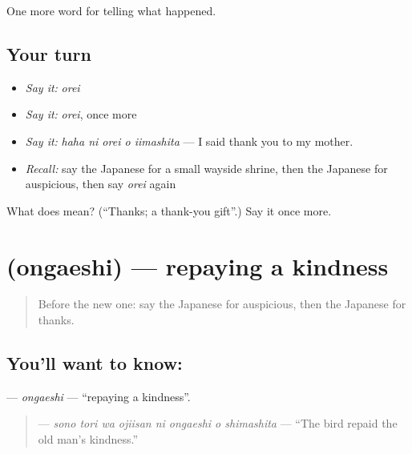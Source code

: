 \begin{grammarlens}[title={What you've built}]
One more word for telling what happened.
\end{grammarlens}

\subsection*{Your turn}
\begin{itemize}
\raggedright
  \item \emph{Say it:} \emph{orei}
  \item \emph{Say it:} \emph{orei}, once more
  \item \emph{Say it:} \emph{haha ni orei o iimashita} — I said thank you to my mother.
  \item \emph{Recall:} say the Japanese for a small wayside shrine, then the Japanese for auspicious, then say \emph{orei} again
\end{itemize}

\begin{tcolorbox}[breakable,colback=teal!4,colframe=teal!35!black,title={Before you move on}]
What does  mean? (\textquotedblleft{}Thanks; a thank-you gift\textquotedblright{}.) Say it once more.
\end{tcolorbox}
\section[\texorpdfstring{\ja{おんがえし} (ongaeshi)}{おんがえし (ongaeshi)}]{ (ongaeshi) — repaying a kindness}

\label{lesson:JA-C304-ongaeshi}



\begin{quote}
Before the new one: say the Japanese for auspicious, then the Japanese for thanks.
\end{quote}

\subsection*{You'll want to know: }
\textbf{} — \emph{ongaeshi} — \textquotedblleft{}repaying a kindness\textquotedblright{}.

\begin{quote}
\textbf{    } — \emph{sono tori wa ojiisan ni ongaeshi o shimashita} — \textquotedblleft{}The bird repaid the old man's kindness.\textquotedblright{}
\end{quote}

